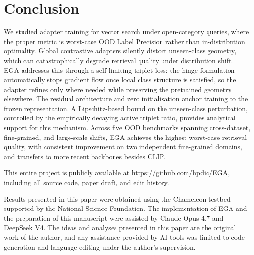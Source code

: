 \documentclass{article}
\begin{document}
\section{Conclusion}
\label{sec:conclusion}

We studied adapter training for vector search under open-category queries, where the proper metric is worst-case OOD Label Precision rather than in-distribution optimality.
Global contrastive adapters silently distort unseen-class geometry, which can catastrophically degrade retrieval quality under distribution shift.
EGA addresses this through a self-limiting triplet loss: the hinge formulation automatically stops gradient flow once local class structure is satisfied, so the adapter refines only where needed while preserving the pretrained geometry elsewhere.
The residual architecture and zero initialization anchor training to the frozen representation.
A Lipschitz-based bound on the unseen-class perturbation, controlled by the empirically decaying active triplet ratio, provides analytical support for this mechanism.
Across five OOD benchmarks spanning cross-dataset, fine-grained, and large-scale shifts, EGA achieves the highest worst-case retrieval quality, with consistent improvement on two independent fine-grained domains, and transfers to more recent backbones besides CLIP.


This entire project is publicly available at \url{https://github.com/hpdic/EGA}, including all source code, paper draft, and edit history.

\begin{ack}
Results presented in this paper were obtained using the Chameleon testbed supported by the National Science Foundation.
The implementation of EGA and the preparation of this manuscript were assisted by Claude Opus 4.7 and DeepSeek V4. The ideas and analyses presented in this paper are the original work of the author, and any assistance provided by AI tools was limited to code generation and language editing under the author's supervision.
\end{ack}
\end{document}
